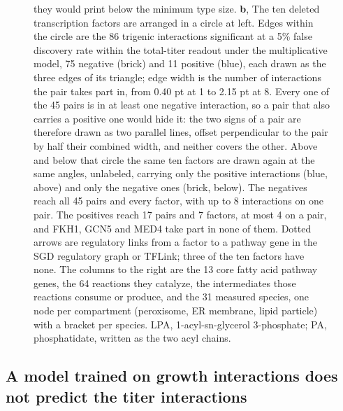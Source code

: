 \begin{figure}[t]
{they would print below the minimum type size. \textbf{b}, The ten deleted transcription
factors are arranged in a circle at left. Edges within the circle are the 86 trigenic
interactions significant at a 5\% false discovery rate within the total-titer readout under
the multiplicative model, 75 negative (brick) and 11 positive (blue), each drawn as the
three edges of its triangle; edge width is the number of interactions the pair takes part
in, from 0.40 pt at 1 to 2.15 pt at 8. Every one of the 45 pairs is in at least one
negative interaction, so a pair that also carries a positive one would hide it: the two
signs of a pair are therefore drawn as two parallel lines, offset perpendicular to the pair
by half their combined width, and neither covers the other. Above and below that circle the
same ten factors are drawn again at the same angles, unlabeled, carrying only the positive
interactions (blue, above) and only the negative ones (brick, below). The negatives reach all 45 pairs and every factor,
with up to 8 interactions on one pair. The positives reach 17 pairs and 7 factors, at most
4 on a pair, and FKH1, GCN5 and MED4 take part in none of them. Dotted arrows are regulatory links from a factor to a
pathway gene in the SGD regulatory graph or TFLink; three of the ten factors have none.
The columns to the right are the 13 core fatty acid pathway genes, the 64 reactions they
catalyze, the intermediates those reactions consume or produce, and the 31 measured
species, one node per compartment (peroxisome, ER membrane, lipid particle) with a bracket
per species. LPA, 1-acyl-sn-glycerol 3-phosphate; PA, phosphatidate, written as the two
acyl chains.}
\label{fig:network}
\end{figure}

\FloatBarrier
\subsection*{A model trained on growth interactions does not predict the titer interactions}

